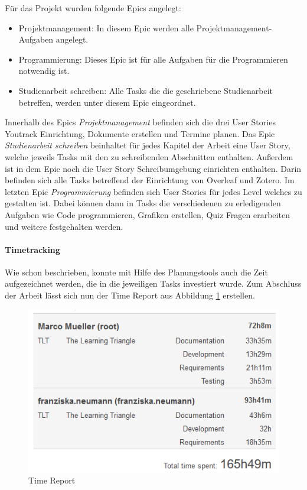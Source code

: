 Für das Projekt wurden folgende Epics angelegt:

\begin{itemize}
\item Projektmanagement: In diesem Epic werden alle Projektmanagement-Aufgaben angelegt.
\item Programmierung: Dieses Epic ist für alle Aufgaben für die Programmieren notwendig ist.
\item Studienarbeit schreiben: Alle Tasks die die geschriebene Studienarbeit betreffen, werden unter diesem Epic eingeordnet.
\end{itemize}

Innerhalb des Epics \textit{Projektmanagement} befinden sich die drei User Stories Youtrack Einrichtung, Dokumente erstellen und Termine planen. Das Epic \textit{Studienarbeit schreiben} beinhaltet für jedes Kapitel der Arbeit eine User Story, welche jeweils Tasks mit den zu schreibenden Abschnitten enthalten. Außerdem ist in dem Epic noch die User Story Schreibumgebung einrichten enthalten. Darin befinden sich alle Tasks betreffend der Einrichtung von Overleaf und Zotero. Im letzten Epic \textit{Programmierung} befinden sich User Stories für jedes Level welches zu gestalten ist. Dabei können dann in Tasks die verschiedenen zu erledigenden Aufgaben wie Code programmieren, Grafiken erstellen, Quiz Fragen erarbeiten und weitere festgehalten werden.

\paragraph{Timetracking}
\label{timetrackingParagraph}
Wie schon beschrieben, konnte mit Hilfe des Planungstools auch die Zeit aufgezeichnet werden, die in die jeweiligen Tasks investiert wurde. Zum Abschluss der Arbeit lässt sich nun der Time Report aus Abbildung \ref{TimeReport} erstellen. 

\begin{figure}[ht]
\centering
\includegraphics[scale=0.65]{bilder/TimeReport.PNG}
\caption{Time Report}
\label{TimeReport}
\end{figure}

